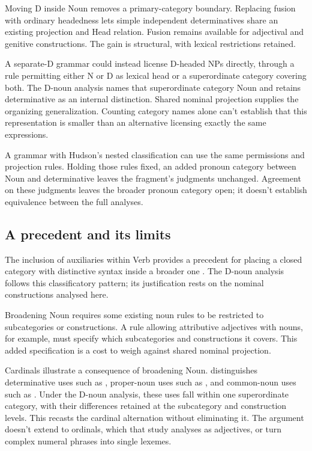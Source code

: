 \documentclass[12pt]{article}
\begin{document}
Moving D inside Noun removes a primary-category boundary. Replacing fusion with ordinary headedness lets simple independent determinatives share an existing projection and Head relation. Fusion remains available for adjectival and genitive constructions. The gain is structural, with lexical restrictions retained.

A separate-D grammar could instead license D-headed NPs directly, through a rule permitting either N or D as lexical head or a superordinate category covering both. The D-noun analysis names that superordinate category Noun and retains determinative as an internal distinction. Shared nominal projection supplies the organizing generalization. Counting category names alone can't establish that this representation is smaller than an alternative licensing exactly the same expressions.

A grammar with Hudson's nested classification can use the same permissions and projection rules. Holding those rules fixed, an added pronoun category between Noun and determinative leaves the fragment's judgments unchanged. Agreement on these judgments leaves the broader pronoun category open; it doesn't establish equivalence between the full analyses.

\subsection{A precedent and its limits}

The inclusion of auxiliaries within Verb provides a precedent for placing a closed category with distinctive syntax inside a broader one \citep{pullumwilson1977}. The D-noun analysis follows this classificatory pattern; its justification rests on the nominal constructions analysed here.

Broadening Noun requires some existing noun rules to be restricted to subcategories or constructions. A rule allowing attributive adjectives with nouns, for example, must specify which subcategories and constructions it covers. This added specification is a cost to weigh against shared nominal projection.

Cardinals illustrate a consequence of broadening Noun. \textcite{reynolds2026numerals} distinguishes determinative uses such as , proper-noun uses such as , and common-noun uses such as . Under the D-noun analysis, these uses fall within one superordinate category, with their differences retained at the subcategory and construction levels. This recasts the cardinal alternation without eliminating it. The argument doesn't extend to ordinals, which that study analyses as adjectives, or turn complex numeral phrases into single lexemes.
\end{document}

